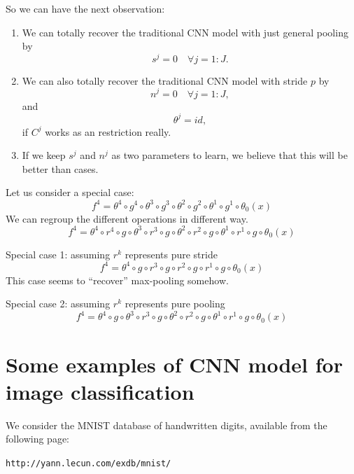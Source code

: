 So we can have the next observation: 
\begin{enumerate}
	\item We can totally recover the traditional CNN model with just general pooling by 
	\begin{equation}
	s^j = 0 \quad \forall j = 1:J.
	\end{equation}
	
	\item We can also totally recover the traditional CNN model with stride $p$ by
	\begin{equation}
	n^j = 0 \quad \forall j = 1:J,
	\end{equation}
	and 
	\begin{equation}
	\theta^j = id,
	\end{equation}
	if $C^j$ works as an restriction really.
	
	\item If we keep $s^j$ and $n^j$ as two parameters to learn, we believe that this will be better than cases. 
\end{enumerate}
Let us consider a special case:
\begin{equation}
f^4=\theta^4\circ g^4\circ\theta^3\circ g^3\circ \theta^2\circ g^2\circ\theta^1\circ g^1\circ\theta_0(x)  
\end{equation}
We can regroup the different operations in different way.
\begin{equation}
f^4=\theta^4\circ r^4\circ g\circ\theta^3\circ r^3\circ g\circ
\theta^2\circ r^2\circ g\circ\theta^1\circ r^1\circ g\circ\theta_0(x)
\end{equation}

Special case 1: assuming $r^k$ represents pure stride 
\begin{equation}
f^4=\theta^4\circ g\circ r^3\circ g
\circ r^2\circ g\circ r^1\circ g\circ\theta_0(x)
\end{equation}
This case seems to ``recover'' max-pooling somehow. 

Special case 2: assuming $r^k$ represents pure pooling
\begin{equation}
f^4=\theta^4\circ g\circ\theta^3\circ r^3\circ g\circ
\theta^2\circ r^2\circ g\circ\theta^1\circ r^1\circ g\circ\theta_0(x)
\end{equation}


\section{Some examples of CNN model for image classification}
We consider the MNIST database of handwritten digits, available from
the following page:
\begin{center}
	{\tt http://yann.lecun.com/exdb/mnist/}
\end{center}

